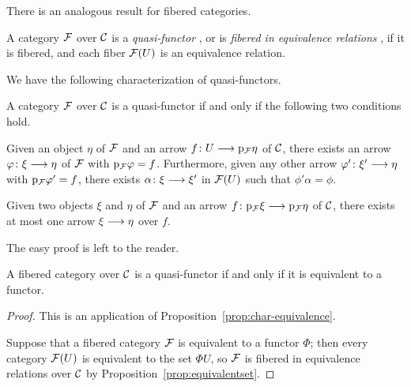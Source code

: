 \begin{3   FIBERED CATEGORIES}
\begin{3.5 Equivalences of fibered categories}
There is an analogous result for fibered categories.

\begin{definition} A category $\mathcal{F}$ over $\mathcal{C}$ is a \emph{quasi-functor}%
, or is \emph{fibered in equivalence relations}%
, if it is fibered, and each fiber $\mathcal{F}(U)$ is an equivalence relation.
\end{definition}

We have the following characterization of quasi-functors.

\begin{proposition}%
\label{prop:characterization-quasifunctors} A category $\mathcal{F}$ over $\mathcal{C}$ is a quasi-functor if and only if the following two conditions hold.

\begin{enumeratei}
\item Given an object $\eta$ of $\mathcal{F}$ and an arrow $f \colon U \arr \p_ \cF \eta$ of $\mathcal{C}$, there exists an arrow $\phi \colon \xi \arr \eta$ of $\mathcal{F}$ with $\mathrm{p}_{\mathcal{F}} \varphi = f$. Furthermore, given any other arrow $\phi'\colon \xi' \arr \eta$ with $\mathrm{p}_{\mathcal{F}}\varphi' = f$, there exists $\alpha\colon \xi \arr \xi'$ in $\mathcal{F}(U)$ such that $\phi'\alpha = \phi$.

\item  Given two objects $\xi$ and $\eta$ of $\mathcal{F}$ and an arrow $f \colon \p_{\cF} \xi \arr \p_{\cF} \eta$ of $\mathcal{C}$, there exists at most one arrow $\xi \arr \eta$ over $f$.
\end{enumeratei}
\end{proposition}

The easy proof is left to the reader.

\begin{proposition}\label{prop:equivalent-functor}
A fibered category over $\mathcal{C}$ is a quasi-functor if and only if it is equivalent to a functor.
\end{proposition}

\begin{proof} This is an application of Proposition~\ref{prop:char-equivalence}.

Suppose that a fibered category $\mathcal{F}$ is equivalent to a functor $\Phi$; then every category $\mathcal{F}(U)$ is equivalent to the set $\Phi U$, so $\mathcal{F}$ is fibered in equivalence relations over $\mathcal{C}$ by Proposition~\ref{prop:equivalentset}.


\end{proof}
\end{3.5 Equivalences of fibered categories}
\end{3   FIBERED CATEGORIES}
